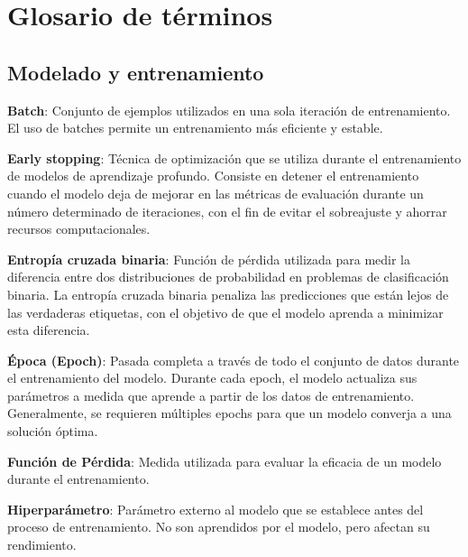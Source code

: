 \section{Glosario de términos}

\subsection{Modelado y entrenamiento}
\textbf{Batch}: Conjunto de ejemplos utilizados en una sola iteración de entrenamiento. El uso de batches permite un entrenamiento más eficiente y estable.

\vspace{5mm}

\textbf{Early stopping}: Técnica de optimización que se utiliza durante el entrenamiento de modelos de aprendizaje profundo. Consiste en detener el entrenamiento cuando el modelo deja de mejorar en las métricas de evaluación durante un número determinado de iteraciones, con el fin de evitar el sobreajuste y ahorrar recursos computacionales.

\vspace{5mm}

\textbf{Entropía cruzada binaria}: Función de pérdida utilizada para medir la diferencia entre dos distribuciones de probabilidad en problemas de clasificación binaria. La entropía cruzada binaria penaliza las predicciones que están lejos de las verdaderas etiquetas, con el objetivo de que el modelo aprenda a minimizar esta diferencia.

\vspace{5mm}

\textbf{Época (Epoch)}: Pasada completa a través de todo el conjunto de datos durante el entrenamiento del modelo. Durante cada epoch, el modelo actualiza sus parámetros a medida que aprende a partir de los datos de entrenamiento. Generalmente, se requieren múltiples epochs para que un modelo converja a una solución óptima.

\vspace{5mm}

\textbf{Función de Pérdida}: Medida utilizada para evaluar la eficacia de un modelo durante el entrenamiento.

\vspace{5mm}

\textbf{Hiperparámetro}: Parámetro externo al modelo que se establece antes del proceso de entrenamiento. No son aprendidos por el modelo, pero afectan su rendimiento.

\vspace{5mm}

